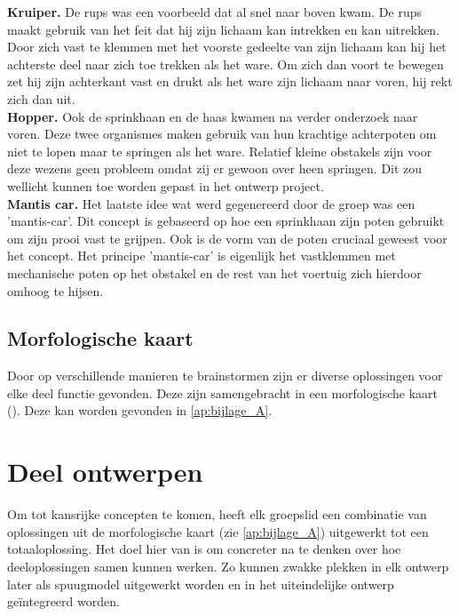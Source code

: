 \vspace{\baselineskip}
{\bf Kruiper.} De rups was een voorbeeld dat al snel naar boven kwam. De rups maakt gebruik van het feit dat hij zijn lichaam kan intrekken en kan uitrekken. Door zich vast te klemmen met het voorste gedeelte van zijn lichaam kan hij het achterste deel naar zich toe trekken als het ware. Om zich dan voort te bewegen zet hij zijn achterkant vast en drukt als het ware zijn lichaam naar voren, hij rekt zich dan uit.
\vspace{\baselineskip}
\\
{\bf Hopper.} Ook de sprinkhaan en de haas kwamen na verder onderzoek naar voren. Deze twee organismes maken gebruik van hun krachtige achterpoten om niet te lopen maar te springen als het ware. Relatief kleine obstakels zijn voor deze wezens geen probleem omdat zij er gewoon over heen springen. Dit zou wellicht kunnen toe worden gepast in het ontwerp project.
\vspace{\baselineskip}
\\
{\bf Mantis car.} Het laatste idee wat werd gegenereerd door de groep was een 'mantis-car'. Dit concept is gebaseerd op hoe een sprinkhaan zijn poten gebruikt om zijn prooi vast te grijpen. Ook is de vorm van de poten cruciaal geweest voor het concept. Het principe 'mantis-car' is eigenlijk het vastklemmen met mechanische poten op het obstakel en de rest van het voertuig zich hierdoor omhoog te hijsen.\\
\vspace{\baselineskip}

\subsection{Morfologische kaart}
Door op verschillende manieren te brainstormen zijn er diverse oplossingen voor elke deel functie gevonden. Deze zijn samengebracht in een morfologische kaart (\cite{toolbox_voor_ontwerpers_ipo_windesheim}). Deze kan worden gevonden in \cref{ap:bijlage_A}. \\


\section{Deel ontwerpen}
\label{se:Deelontwerpen}
Om tot kansrijke concepten te komen, heeft elk groepslid een combinatie van oplossingen uit de morfologische kaart (zie \cref{ap:bijlage_A}) uitgewerkt tot een totaaloplossing. Het doel hier van is om concreter na te denken over hoe deeloplossingen samen kunnen werken. Zo kunnen zwakke plekken in elk ontwerp later als spuugmodel uitgewerkt worden en in het uiteindelijke ontwerp geïntegreerd worden.\\
\vspace{\baselineskip}

